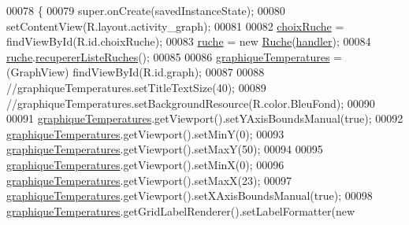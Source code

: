 \begin{DoxyCode}
00078                                                        \{
00079         super.onCreate(savedInstanceState);
00080         setContentView(R.layout.activity\_graph);
00081 
00082         \hyperlink{classfr_1_1campus_1_1laurainc_1_1honeybee_1_1_graph_activity_ad937ed762b691b70747bb9f0b4d44994}{choixRuche} = findViewById(R.id.choixRuche);
00083         \hyperlink{classfr_1_1campus_1_1laurainc_1_1honeybee_1_1_graph_activity_ae4312ed40c4a4bf731eb0834155165de}{ruche} = \textcolor{keyword}{new} \hyperlink{class_ruche}{Ruche}(\hyperlink{classfr_1_1campus_1_1laurainc_1_1honeybee_1_1_graph_activity_ac42217c5db8be9ce814ab813e2d3080c}{handler});
00084         \hyperlink{classfr_1_1campus_1_1laurainc_1_1honeybee_1_1_graph_activity_ae4312ed40c4a4bf731eb0834155165de}{ruche}.\hyperlink{classfr_1_1campus_1_1laurainc_1_1honeybee_1_1_ruche_aba0591cda391b907da41a0afeba4d59d}{recupererListeRuches}();
00085 
00086          \hyperlink{classfr_1_1campus_1_1laurainc_1_1honeybee_1_1_graph_activity_ab266262244788c2878b8f1b0587ae5ad}{graphiqueTemperatures} = (GraphView) findViewById(R.id.graph);
00087 
00088         \textcolor{comment}{//graphiqueTemperatures.setTitleTextSize(40);}
00089         \textcolor{comment}{//graphiqueTemperatures.setBackgroundResource(R.color.BleuFond);}
00090 
00091         \hyperlink{classfr_1_1campus_1_1laurainc_1_1honeybee_1_1_graph_activity_ab266262244788c2878b8f1b0587ae5ad}{graphiqueTemperatures}.getViewport().setYAxisBoundsManual(\textcolor{keyword}{true});
00092         \hyperlink{classfr_1_1campus_1_1laurainc_1_1honeybee_1_1_graph_activity_ab266262244788c2878b8f1b0587ae5ad}{graphiqueTemperatures}.getViewport().setMinY(0);
00093         \hyperlink{classfr_1_1campus_1_1laurainc_1_1honeybee_1_1_graph_activity_ab266262244788c2878b8f1b0587ae5ad}{graphiqueTemperatures}.getViewport().setMaxY(50);
00094 
00095         \hyperlink{classfr_1_1campus_1_1laurainc_1_1honeybee_1_1_graph_activity_ab266262244788c2878b8f1b0587ae5ad}{graphiqueTemperatures}.getViewport().setMinX(0);
00096         \hyperlink{classfr_1_1campus_1_1laurainc_1_1honeybee_1_1_graph_activity_ab266262244788c2878b8f1b0587ae5ad}{graphiqueTemperatures}.getViewport().setMaxX(23);
00097         \hyperlink{classfr_1_1campus_1_1laurainc_1_1honeybee_1_1_graph_activity_ab266262244788c2878b8f1b0587ae5ad}{graphiqueTemperatures}.getViewport().setXAxisBoundsManual(\textcolor{keyword}{true});
00098         \hyperlink{classfr_1_1campus_1_1laurainc_1_1honeybee_1_1_graph_activity_ab266262244788c2878b8f1b0587ae5ad}{graphiqueTemperatures}.getGridLabelRenderer().setLabelFormatter(\textcolor{keyword}{new} 

\end{DoxyCode}
